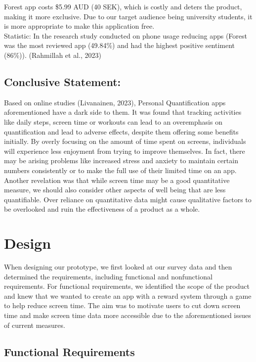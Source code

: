 \documentclass[sigconf, 11pt]{acmart}
\begin{document}
Forest app costs \$5.99 AUD (40 SEK), which is costly and deters the product, making it more exclusive. Due to our target audience being university students, it is more appropriate to make this application free. 
\\

Statistic: In the research study conducted on phone usage reducing apps (Forest was the most reviewed app (49.84\%) and had the highest positive sentiment (86\%)). (Rahmillah et al., 2023)


\subsection{Conclusive Statement:}
Based on online studies (Livanainen, 2023), Personal Quantification apps aforementioned have a dark side to them. It was found that tracking activities like daily steps, screen time or workouts can lead to an overemphasis on quantification and lead to adverse effects, despite them offering some benefits initially. By overly focusing on the amount of time spent on screens, individuals will experience less enjoyment from trying to improve themselves. In fact, there may be arising problems like increased stress and anxiety to maintain certain numbers consistently or to make the full use of their limited time on an app. Another revelation was that while screen time may be a good quantitative measure, we should also consider other aspects of well being that are less quantifiable. Over reliance on quantitative data might cause qualitative factors to be overlooked and ruin the effectiveness of a product as a whole.


\section{Design}
When designing our prototype, we first looked at our survey data and then determined the requirements, including functional and nonfunctional requirements. For functional requirements, we identified the scope of the product and knew that we wanted to create an app with a reward system through a game to help reduce screen time. The aim was to motivate users to cut down screen time and make screen time data more accessible due to the aforementioned issues of current measures. 

\subsection{Functional Requirements}
\end{document}
